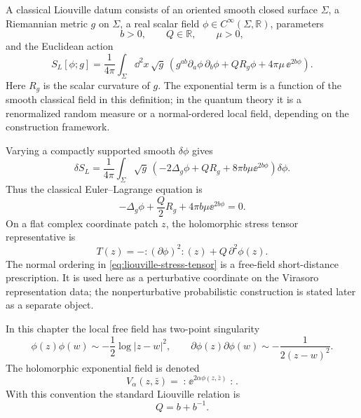 \begin{definition}
\label{def:classical-liouville-datum}
A classical Liouville datum consists of an oriented smooth closed surface
\(\Sigma\), a Riemannian metric \(g\) on \(\Sigma\), a real scalar field
\(\phi\in C^\infty(\Sigma,\mathbb R)\), parameters
\[
  b>0,\qquad Q\in\mathbb R,\qquad \mu>0,
\]
and the Euclidean action
\begin{equation}
  S_L[\phi;g]
  =
  \frac1{4\pi}
  \int_\Sigma \dd^2x\,\sqrt g\,
  \left(
    g^{ab}\partial_a\phi\,\partial_b\phi
    +Q R_g\phi
    +4\pi\mu\,\ee^{2b\phi}
  \right).
  \label{eq:liouville-classical-action}
\end{equation}
Here \(R_g\) is the scalar curvature of \(g\).  The exponential term is a
function of the smooth classical field in this definition; in the quantum
theory it is a renormalized random measure or a normal-ordered local field,
depending on the construction framework.
\end{definition}

Varying a compactly supported smooth \(\delta\phi\) gives
\[
  \delta S_L
  =
  \frac1{4\pi}
  \int_\Sigma\sqrt g\,
  \left(
    -2\Delta_g\phi+Q R_g+8\pi b\mu\ee^{2b\phi}
  \right)\delta\phi .
\]
Thus the classical Euler--Lagrange equation is
\begin{equation}
  -\Delta_g\phi+\frac Q2 R_g+4\pi b\mu\ee^{2b\phi}=0.
  \label{eq:liouville-classical-eom}
\end{equation}
On a flat complex coordinate patch \(z\), the holomorphic stress tensor
representative is
\begin{equation}
  T(z)
  =
  -:\!(\partial\phi)^2\!:(z)+Q\,\partial^2\phi(z).
  \label{eq:liouville-stress-tensor}
\end{equation}
The normal ordering in \eqref{eq:liouville-stress-tensor} is a free-field
short-distance prescription.  It is used here as a perturbative coordinate on
the Virasoro representation data; the nonperturbative probabilistic
construction is stated later as a separate object.

\begin{convention}
\label{conv:liouville-free-field-normalization}
In this chapter the local free field has two-point singularity
\[
  \phi(z)\phi(w)\sim -\frac12\log |z-w|^2,
  \qquad
  \partial\phi(z)\partial\phi(w)\sim -\frac1{2(z-w)^2}.
\]
The holomorphic exponential field is denoted
\[
  V_\alpha(z,\bar z)=\mathopen{:}\ee^{2\alpha\phi(z,\bar z)}\mathclose{:}.
\]
With this convention the standard Liouville relation is
\begin{equation}
  Q=b+b^{-1}.
  \label{eq:liouville-Q-b-relation}
\end{equation}
\end{convention}

